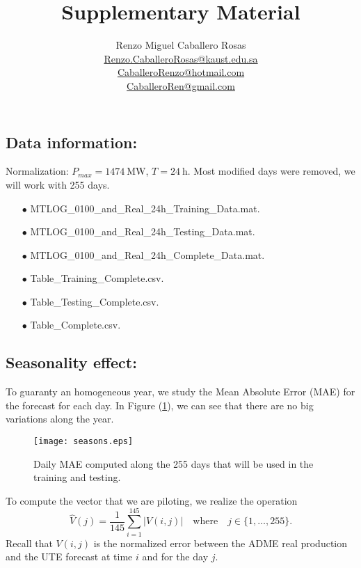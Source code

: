 \documentclass[12pt]{article}
\theoremstyle{definition}
\theoremstyle{remark}
\begin{document}
\title{Supplementary Material}
\author{Renzo Miguel Caballero Rosas\\
\url{Renzo.CaballeroRosas@kaust.edu.sa}\\
\url{CaballeroRenzo@hotmail.com}\\
\url{CaballeroRen@gmail.com}} 
\maketitle

\subsection*{Data information:}

Normalization: $P_{max}=\SI{1474}{\mega\watt}$, $T=\SI{24}{\hour}$. Most modified days were removed, we will work with 255 days.

\begin{enumerate}
\item[$\bullet$] MTLOG\_0100\_and\_Real\_24h\_Training\_Data.mat.
\item[$\bullet$] MTLOG\_0100\_and\_Real\_24h\_Testing\_Data.mat.
\item[$\bullet$] MTLOG\_0100\_and\_Real\_24h\_Complete\_Data.mat.
\item[$\bullet$] Table\_Training\_Complete.csv.
\item[$\bullet$] Table\_Testing\_Complete.csv.
\item[$\bullet$] Table\_Complete.csv.
\end{enumerate}

\pagebreak 

\subsection*{Seasonality effect:}

To guaranty an homogeneous year, we study the Mean Absolute Error (MAE) for the forecast for each day. In Figure (\ref{plot1}), we can see that there are no big variations along the year.

\begin{figure}[ht!]
\centering
{\texttt{[image: seasons.eps]}}
\caption{Daily MAE computed along the 255 days that will be used in the training and testing.}\label{plot1}
\end{figure}
To compute the vector that we are piloting, we realize the operation
\begin{equation*}
\hat{V}(j) =\frac{1}{145} \sum_{i=1}^{145}|V(i,j)|\quad\text{where}\quad j\in\{1,\dots,255\}.
\end{equation*}
Recall that $V(i,j)$ is the normalized error between the ADME real production and the UTE forecast at time $i$ and for the day $j$.
\end{document}
